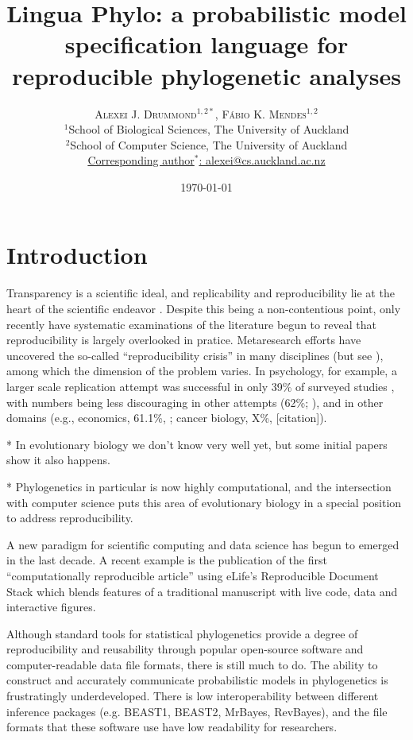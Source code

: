 \documentclass[oneside]{article}
\title{Lingua Phylo: a probabilistic model specification language for
  reproducible phylogenetic analyses}
\author{\textsc{Alexei J. Drummond$^{1,2*}$}, \textsc{F\'{a}bio K. Mendes$^{1,2}$}\\%
\small $^1$School of Biological Sciences, The University of Auckland\\
\small $^2$School of Computer Science, The University of Auckland\\
\small
\href{mailto:alexei@cs.auckland.ac.nz}{Corresponding author$^*$: alexei@cs.auckland.ac.nz}
}
\date{\today} %
\begin{document}
\maketitle


\section{Introduction}

Transparency is a scientific ideal, and replicability and
reproducibility lie at the heart of the scientific endeavor
\citep{nas19,munafo17}.
Despite this being a non-contentious point, only recently have
systematic examinations of the literature begun to reveal that
reproducibility is largely overlooked in pratice.
Metaresearch efforts have uncovered the so-called ``reproducibility
crisis'' \citep{baker16} in many disciplines (but see
\citep{fanneli18}), among which the dimension of the problem varies.
In psychology, for example, a larger scale replication attempt was
successful in only 39\% of surveyed studies \citep{openscience15},
with numbers being less discouraging in other attempts (62\%;
\citep{camerer18}), and in other domains (e.g., economics, 61.1\%,
\citep{camerer16}; cancer biology, X\%, [citation]).

* In evolutionary biology we don't know very well yet, but some
initial papers show it also happens.

* Phylogenetics in particular is now highly computational, and the
intersection with computer science puts this area of evolutionary
biology in a special position to address reproducibility.

A new paradigm for scientific computing and data science has begun to
emerged in the last decade.
A recent example is the publication of the
first ``computationally reproducible article'' using eLife's
Reproducible Document Stack which blends features of a traditional
manuscript with live code, data and interactive figures. 

Although standard tools for statistical phylogenetics provide a degree
of reproducibility and reusability through popular open-source
software and computer-readable data file formats, there is still much
to do.
The ability to construct and accurately communicate
probabilistic models in phylogenetics is frustratingly
underdeveloped.
There is low interoperability between different
inference packages (e.g. BEAST1, BEAST2, MrBayes, RevBayes), and the
file formats that these software use have low readability for
researchers. 
\end{document}
